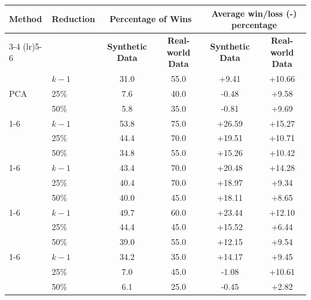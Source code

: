 \begin{tabular}{l l cc cc}
\toprule
\textbf{Method} & \textbf{Reduction} & \multicolumn{2}{c}{\textbf{Percentage of Wins}} & \multicolumn{2}{c}{\textbf{Average win/loss (-) percentage}} \\
\cmidrule(lr){3-4} \cmidrule(lr){5-6}
& & \textbf{Synthetic Data} & \textbf{Real-world Data} & \textbf{Synthetic Data} & \textbf{Real-world Data} \\
\midrule
\multirow{3}{*}{PCA} & $k-1$ & 31.0 & 55.0 & +9.41 & +10.66 \\
 & 25\% & 7.6 & 40.0 & -0.48 & +9.58 \\
 & 50\% & 5.8 & 35.0 & -0.81 & +9.69 \\
\cmidrule(lr){1-6}
\multirow{3}{*}{Kernel PCA} & $k-1$ & 53.8 & 75.0 & +26.59 & +15.27 \\
 & 25\% & 44.4 & 70.0 & +19.51 & +10.71 \\
 & 50\% & 34.8 & 55.0 & +15.26 & +10.42 \\
\cmidrule(lr){1-6}
\multirow{3}{*}{VAE} & $k-1$ & 43.4 & 70.0 & +20.48 & +14.28 \\
 & 25\% & 40.4 & 70.0 & +18.97 & +9.34 \\
 & 50\% & 40.0 & 45.0 & +18.11 & +8.65 \\
\cmidrule(lr){1-6}
\multirow{3}{*}{Isomap} & $k-1$ & 49.7 & 60.0 & +23.44 & +12.10 \\
 & 25\% & 44.4 & 45.0 & +15.52 & +6.44 \\
 & 50\% & 39.0 & 55.0 & +12.15 & +9.54 \\
\cmidrule(lr){1-6}
\multirow{3}{*}{MDS} & $k-1$ & 34.2 & 35.0 & +14.17 & +9.45 \\
 & 25\% & 7.0 & 45.0 & -1.08 & +10.61 \\
 & 50\% & 6.1 & 25.0 & -0.45 & +2.82 \\
\bottomrule\end{tabular}
